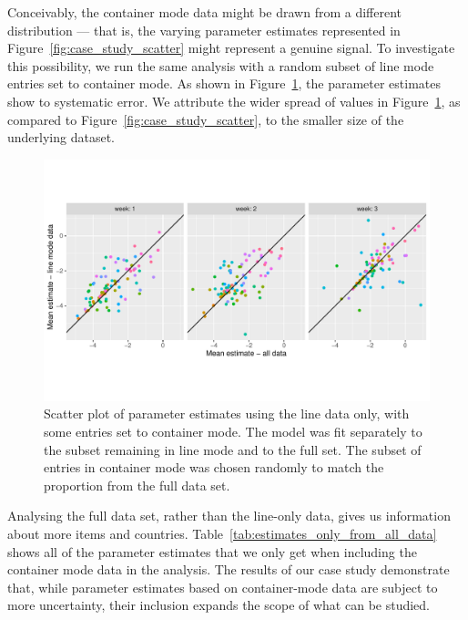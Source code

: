 \documentclass[aoas]{imsart}
\begin{document}
Conceivably, the container mode data might be drawn from a different distribution --- that is, the varying parameter estimates represented in Figure~\ref{fig:case_study_scatter} might represent a genuine signal. To investigate this possibility, we run the same analysis with a random subset of line mode entries set to container mode. As shown in Figure~\ref{fig:case_study_new_scatter}, the parameter estimates show to systematic error. We attribute the wider spread of values in Figure~\ref{fig:case_study_new_scatter}, as compared to Figure~\ref{fig:case_study_scatter}, to the smaller size of the underlying dataset.

\begin{figure}[h!]
  \includegraphics[width=\textwidth]{../visualisations/new_figures/new_line_data_comparision.pdf}
  \caption{Scatter plot of parameter estimates using the line data only, with some entries set to container mode. The model was fit separately to the subset remaining in line mode and to the full set. The subset of entries in container mode was chosen randomly to match the proportion from the full data set.}
  \label{fig:case_study_new_scatter}
\end{figure}

Analysing the full data set, rather than the line-only data, gives us information about more items and countries. Table~\ref{tab:estimates_only_from_all_data} shows all of the parameter estimates that we only get when including the container mode data in the analysis. The results of our case study demonstrate that, while parameter estimates based on container-mode data are subject to more uncertainty, their inclusion expands the scope of what can be studied.
\end{document}

